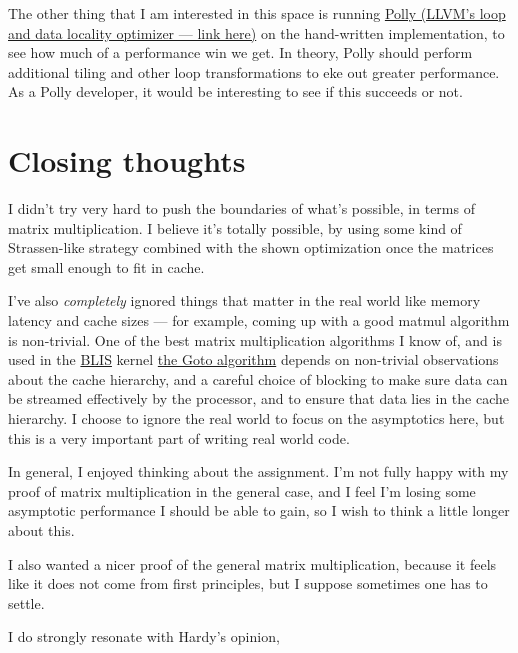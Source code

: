 \documentclass[11pt]{article}
\begin{document}
The other thing that I am interested in this space is running
\href{https://polly.llvm.org/}{Polly (LLVM's loop and data locality optimizer --- link here)} on the hand-written
implementation, to see how much of a performance win we get. In
theory, Polly should perform additional tiling and other loop transformations
to eke out greater performance. As a Polly developer, it would be interesting
to see if this succeeds or not.



\section{Closing thoughts}
I didn't try very hard to push the boundaries of what's possible, in terms
of matrix multiplication. I believe it's totally possible, by using some kind
of Strassen-like strategy combined with the shown optimization once the
matrices get small enough to fit in cache.

I've also \textit{completely} ignored things that matter in the real world
like memory latency and cache sizes --- for example, coming up with a good
matmul algorithm is non-trivial. One of the best matrix multiplication algorithms I know of,
and is used in the \href{https://github.com/flame/blis}{BLIS} kernel
\href{https://www.cs.utexas.edu/users/pingali/CS378/2008sp/papers/gotoPaper.pdf}{the Goto algorithm}
depends on non-trivial observations about the cache hierarchy,
and a careful choice of blocking to make sure data can be streamed effectively
by the processor, and to ensure that data lies in the cache hierarchy. I
choose to ignore the real world to focus on the asymptotics here, but this
is a very important part of writing real world code.

In general, I enjoyed thinking about the assignment. I'm not fully happy with
my proof of matrix multiplication in the general case, and I feel I'm
losing some asymptotic performance I should be able to gain, so I wish to
think a little longer about this.

I also wanted a nicer proof of the general matrix multiplication, because it
feels like it does not come from first principles, but I suppose sometimes one
has to settle.

I do strongly resonate with Hardy's opinion, 
\end{document}
